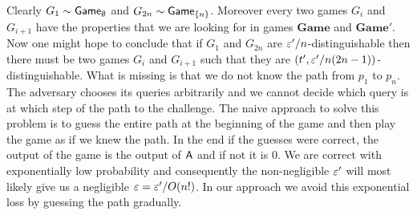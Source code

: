 \documentclass{article}
\def\A{{\sf A}}
\newcommand{\game}{{\sf Game}}
\newcommand{\dgame}{{\mathbf{Game}}}
\begin{document}
  Clearly $G_1 \sim \game_{\emptyset}$ and $G_{2n}\sim\game_{\cub{n}}$. Moreover every two games $G_i$ and $G_{i+1}$ have the properties that we are looking for in games $\dgame$ and $\dgame'$. Now one might hope to conclude that if $G_1$ and $G_{2n}$ are $\varepsilon'/n$-distinguishable then there must be two games $G_i$ and $G_{i+1}$ such that they are $(t',\varepsilon'/n(2n-1))$-distinguishable. What is missing is that we do not know the path from $p_1$ to $p_n$. The adversary chooses its queries arbitrarily and we cannot decide which query is at which step of the path to the challenge. The naive approach to solve this problem is to guess the entire path at the beginning of the game and then play the game as if we knew the path. In the end if the guesses were correct, the output of the game is the output of $\A$ and if not it is 0. We are correct with exponentially low probability and consequently the non-negligible $\varepsilon'$ will most likely give us a negligible $\varepsilon= \varepsilon'/O(n!)$. In our approach we avoid this exponential loss by guessing the path gradually.\\
\end{document}

